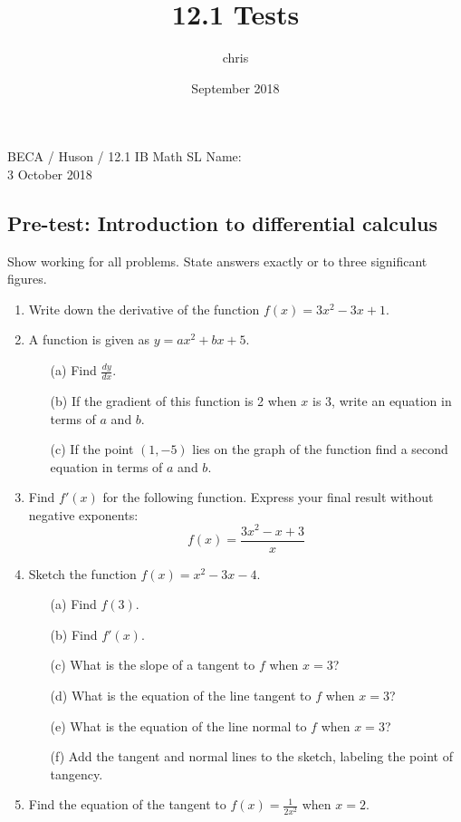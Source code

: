 \documentclass{article}
\title{12.1 Tests}
\author{chris }
\date{September 2018}
\begin{document}
\noindent BECA / Huson / 12.1 IB Math SL \qquad \qquad Name:\\
3 October 2018
\subsection*{Pre-test: Introduction to differential calculus}
Show working for all problems. State answers exactly or to three significant figures.

\begin{enumerate}

\item Write down the derivative of the function $f(x) = 3x^2 - 3x + 1$.

\item	A function is given as $y = ax^2 + bx + 5$.

\begin{itemize}
    \item[(a)] Find $\displaystyle \frac {dy}{dx}$.
	\item[(b)] If the gradient of this function is 2 when $x$ is 3, write an equation in terms of $a$ and $b$.
	\item[(c)] If the point $(1, -5)$ lies on the graph of the function find a second equation in terms of $a$ and $b$.
\end{itemize}

\item Find $f'(x)$  for the following function. Express your final result without negative exponents:
	 \[	f(x) = \frac{3x^2-x+3}{x}\]

\item	Sketch the function $f(x) = x^2 - 3x - 4$.
\begin{itemize}
    \item[(a)] Find $f(3)$.
	\item[(b)] Find $f'(x)$.
	\item[(c)] What is the slope of a tangent to $f$ when $x=3$?
	\item[(d)] What is the equation of the line tangent to $f$ when $x=3$?
	\item[(e)] What is the equation of the line normal to $f$ when $x=3$?
	\item[(f)] Add the tangent and normal lines to the sketch, labeling the point of tangency.
\end{itemize}

\item Find the equation of the tangent to $\displaystyle f(x) = \frac{1}{2x^2}$ when $x = 2$.


\end{enumerate}
\end{document}
